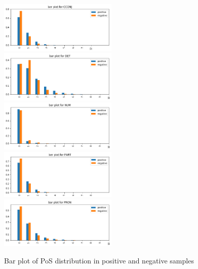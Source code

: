 \documentclass[12pt]{diazessay} %
\begin{document}
{\begin{figure}[h!]
    \includegraphics[width=0.5\textwidth]{graphs/bar_pos/7.png}
    \includegraphics[width=0.5\textwidth]{graphs/bar_pos/8.png}
    \includegraphics[width=0.5\textwidth]{graphs/bar_pos/9.png}
    \includegraphics[width=0.5\textwidth]{graphs/bar_pos/10.png}
    \includegraphics[width=0.5\textwidth]{graphs/bar_pos/11.png}

    \caption{Bar plot of PoS distribution in positive and negative samples}
    
\end{figure}

}
\end{document}
